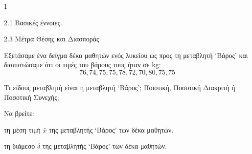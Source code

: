 \begin{ylh}{1}
    \item 2.1 Βασικές έννοιες.
    \item 2.3 Μέτρα Θέσης και Διασποράς
\end{ylh}
Εξετάσαμε ένα δείγμα δέκα μαθητών ενός λυκείου ως προς τη μεταβλητή ‘Βάρος’ και διαπιστώσαμε ότι οι τιμές του βάρους τους ήταν σε kg:
\[
76, 74, 75, 75, 78, 72, 70, 80, 75, 75
\]
\begin{alist}
    \item Τι είδους μεταβλητή είναι η μεταβλητή ‘Βάρος’; Ποιοτική, Ποσοτική Διακριτή ή Ποσοτική Συνεχής; 
    \item Να βρείτε:
    \begin{rlist}
        \item τη μέση τιμή $\bar{x}$ της μεταβλητής ‘Βάρος’ των δέκα μαθητών. 
        \item τη διάμεσο $δ$ της μεταβλητής ‘Βάρος’ των δέκα μαθητών. 
    \end{rlist}
\end{alist}

